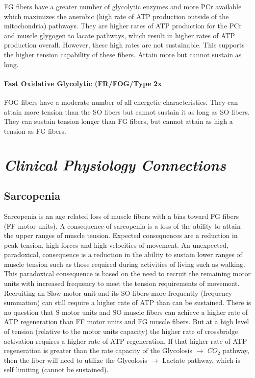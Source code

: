 FG fibers have a greater number of glycolytic enzymes and more PCr available which maximizes the anerobic (high rate of ATP production outside of the mitochondria) pathways. They are higher rates of ATP production for the PCr and muscle glygogen to lacate pathways, which result in higher rates of ATP production overall. However, these high rates are not sustainable. This supports the higher tension capability of these fibers. Attain more but cannot sustain as long.

\paragraph{Fast Oxidative Glycolytic (FR/FOG/Type 2x}

FOG fibers have a moderate number of all energetic characteristics. They can attain more tension than the SO fibers but cannot sustain it as long as SO fibers. They can sustain tension longer than FG fibers, but cannot attain as high a tension as FG fibers. 






\section{\textit{Clinical Physiology Connections}}

\subsection{Sarcopenia}

Sarcopenia is an age related loss of muscle fibers with a bias toward FG fibers (FF motor units). A consequence of sarcopenia is a loss of the ability to attain the upper ranges of muscle tension. Expected consequences are a reduction in peak tension, high forces and high velocities of movement. An unexpected, paradoxical, consequence is a reduction in the ability to sustain lower ranges of muscle tension such as those required during activities of living such as walking. This paradoxical consequence is based on the need to recruit the remaining motor units with increased frequency to meet the tension requirements of movement. Recruiting an Slow motor unit and its SO fibers more frequently (frequency summation) can still require a higher rate of ATP than can be sustained. There is no question that S motor units and SO muscle fibers can achieve a higher rate of ATP regeneration than FF motor units and FG muscle fibers. But at a high level of tension (relative to the motor units capacity) the higher rate of crossbridge activation requires a higher rate of ATP regeneration. If that higher rate of ATP regeneration is greater than the rate capacity of the Glycolosis $\rightarrow$ $CO_2$ pathway, then the fiber will need to utilize the Glycolosis $\rightarrow$ Lactate pathway, which is self limiting (cannot be sustained). 

